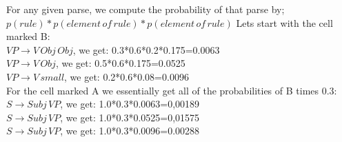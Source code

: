 \documentclass[12pt]{article}
\newenvironment{answer}[2][Answer]{\begin{trivlist}
\item[\hskip \labelsep {\bfseries #1}\hskip \labelsep {\bfseries #2:}]}{\end{trivlist}}
\begin{document}
\begin{answer}{a)}

For any given parse, we compute the probability of that parse by; $p(rule)*p(element\, of \, rule)*p(element \, of \, rule)$
Lets start with the cell marked B: \\
$VP \to V \, Obj \, Obj$, we get: 0.3*0.6*0.2*0.175=0.0063 \\
$VP \to V \, Obj$, we get: 0.5*0.6*0.175=0.0525 \\
$VP \to V \, small$, we get: 0.2*0.6*0.08=0.0096 \\

For the cell marked A we essentially get all of the probabilities of B times 0.3: \\
$S \to Subj \, VP$, we get: 1.0*0.3*0.0063=0,00189 \\
$S \to Subj \, VP$, we get: 1.0*0.3*0.0525=0,01575 \\
$S \to Subj \, VP$, we get: 1.0*0.3*0.0096=0.00288 \\


\end{answer}
\end{document}
